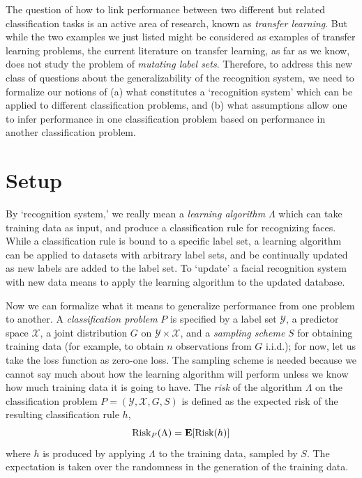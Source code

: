 The question of how to link performance between two different but
related classification tasks is an active area of research, known as
\emph{transfer learning}.  But while the two examples we just listed
might be considered as examples of transfer learning problems, the
current literature on transfer learning, as far as we know, does not
study the problem of \emph{mutating label sets}.  Therefore, to
address this new class of questions about the generalizability of the
recognition system, we need to formalize our notions of (a) what
constitutes a `recognition system' which can be applied to different
classification problems, and (b) what assumptions allow one to infer
performance in one classification problem based on performance in
another classification problem.

\section{Setup}

By `recognition system,' we really mean a \emph{learning algorithm}
$\Lambda$ which can take training data as input, and produce a
classification rule for recognizing faces.  While a classification
rule is bound to a specific label set, a learning algorithm can be
applied to datasets with arbitrary label sets, and be continually
updated as new labels are added to the label set.  To `update' a
facial recognition system with new data means to apply the learning
algorithm to the updated database.

Now we can formalize what it means to generalize performance from one
problem to another.  A \emph{classification problem} $P$ is specified
by a label set $\mathcal{Y}$, a predictor space $\mathcal{X}$, a joint
distribution $G$ on $\mathcal{Y} \times \mathcal{X}$, and a
\emph{sampling scheme} $S$ for obtaining training data (for example,
to obtain $n$ observations from $G$ i.i.d.); for now, let us take the
loss function as zero-one loss.  The sampling scheme is needed because
we cannot say much about how the learning algorithm will perform
unless we know how much training data it is going to have.  The
\emph{risk} of the algorithm $\Lambda$ on the classification problem
$P = (\mathcal{Y}, \mathcal{X}, G, S)$ is defined as the expected risk
of the resulting classification rule $h$,
\[
\text{Risk}_P(\Lambda) = \textbf{E}[\text{Risk}(h)]
\]
where $h$ is produced by applying $\Lambda$ to the training data,
sampled by $S$.  The expectation is taken over the randomness in the
generation of the training data.

